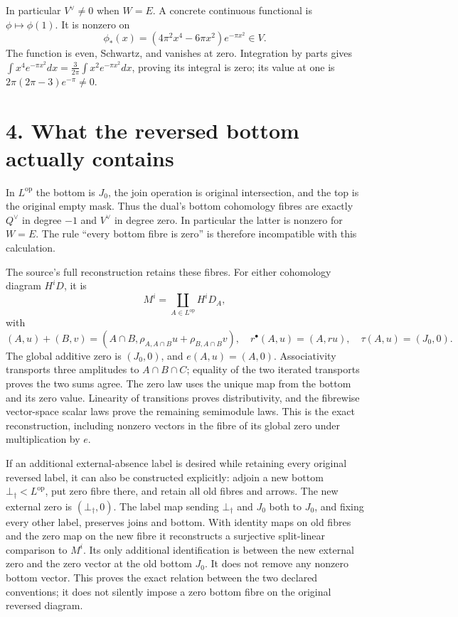 In particular \(V^\vee\ne0\) when \(W=E\). A concrete continuous
functional is \(\phi\mapsto\phi(1)\). It is nonzero on \[
\phi_*(x)=(4\pi^2x^4-6\pi x^2)e^{-\pi x^2}\in V.
\] The function is even, Schwartz, and vanishes at zero. Integration by
parts gives
\(\int x^4e^{-\pi x^2}dx=\frac{3}{2\pi}\int x^2e^{-\pi x^2}dx\), proving
its integral is zero; its value at one is \(2\pi(2\pi-3)e^{-\pi}\ne0\).

\section{4. What the reversed bottom actually
contains}\label{proof03:what-the-reversed-bottom-actually-contains}

In \(L^{\mathrm{op}}\) the bottom is \(J_0\), the join operation is
original intersection, and the top is the original empty mask. Thus the
dual's bottom cohomology fibres are exactly \(Q^\vee\) in degree \(-1\)
and \(V^\vee\) in degree zero. In particular the latter is nonzero for
\(W=E\). The rule ``every bottom fibre is zero'' is therefore
incompatible with this calculation.

The source's full reconstruction retains these fibres. For either
cohomology diagram \(H^iD\), it is \[
M^i=\coprod_{A\in L^{\mathrm{op}}}H^iD_A,
\] with \[
(A,u)+(B,v)=
(A\cap B,\rho_{A,A\cap B}u+\rho_{B,A\cap B}v),
\quad
r^\bullet(A,u)=(A,ru),
\quad
\tau(A,u)=(J_0,0).
\] The global additive zero is \((J_0,0)\), and \(e(A,u)=(A,0)\).
Associativity transports three amplitudes to \(A\cap B\cap C\); equality
of the two iterated transports proves the two sums agree. The zero law
uses the unique map from the bottom and its zero value. Linearity of
transitions proves distributivity, and the fibrewise vector-space scalar
laws prove the remaining semimodule laws. This is the exact
reconstruction, including nonzero vectors in the fibre of its global
zero under multiplication by \(e\).

If an additional external-absence label is desired while retaining every
original reversed label, it can also be constructed explicitly: adjoin a
new bottom \(\bot_\dagger<L^{\mathrm{op}}\), put zero fibre there, and
retain all old fibres and arrows. The new external zero is
\((\bot_\dagger,0)\). The label map sending \(\bot_\dagger\) and \(J_0\)
both to \(J_0\), and fixing every other label, preserves joins and
bottom. With identity maps on old fibres and the zero map on the new
fibre it reconstructs a surjective split-linear comparison to \(M^i\).
Its only additional identification is between the new external zero and
the zero vector at the old bottom \(J_0\). It does not remove any
nonzero bottom vector. This proves the exact relation between the two
declared conventions; it does not silently impose a zero bottom fibre on
the original reversed diagram.

